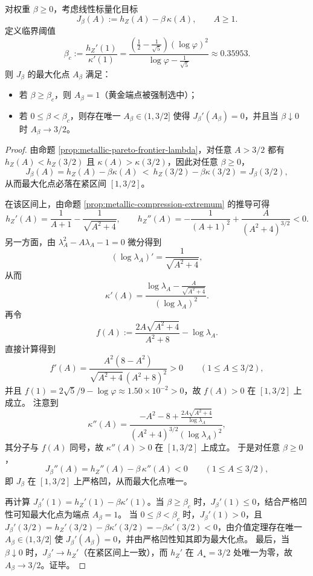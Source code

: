 \begin{proposition}[线性权衡的端点相变阈值]\label{prop:metallic-linear-scalarization-threshold}
对权重 \(\beta\ge 0\)，考虑线性标量化目标
\[
J_\beta(A):=h_Z(A)-\beta\,\kappa(A),\qquad A\ge 1.
\]
定义临界阈值
\[
\beta_c:=\frac{h_Z'(1)}{\kappa'(1)}
=\frac{\left(\frac{1}{2}-\frac{1}{\sqrt5}\right)(\log\varphi)^2}{\log\varphi-\frac{1}{\sqrt5}}
\approx 0.35953.
\]
则 \(J_\beta\) 的最大化点 \(A_\beta\) 满足：
\begin{itemize}
  \item 若 \(\beta\ge \beta_c\)，则 \(A_\beta=1\)（黄金端点被强制选中）；
  \item 若 \(0\le \beta<\beta_c\)，则存在唯一 \(A_\beta\in(1,3/2]\) 使得 \(J_\beta'(A_\beta)=0\)，并且当 \(\beta\downarrow 0\) 时 \(A_\beta\to 3/2\)。
\end{itemize}
\end{proposition}
\begin{proof}
由命题 \ref{prop:metallic-pareto-frontier-lambda}，对任意 \(A>3/2\) 都有 \(h_Z(A)<h_Z(3/2)\) 且 \(\kappa(A)>\kappa(3/2)\)，因此对任意 \(\beta\ge 0\)，
\[
J_\beta(A)=h_Z(A)-\beta\kappa(A)\ <\ h_Z(3/2)-\beta\kappa(3/2)=J_\beta(3/2),
\]
从而最大化点必落在紧区间 \([1,3/2]\)。
\par
在该区间上，由命题 \ref{prop:metallic-compression-extremum} 的推导可得
\[
h_Z'(A)=\frac{1}{A+1}-\frac{1}{\sqrt{A^2+4}},\qquad
h_Z''(A)=-\frac{1}{(A+1)^2}+\frac{A}{(A^2+4)^{3/2}}<0.
\]
另一方面，由 \(\lambda_A^2-A\lambda_A-1=0\) 微分得到
\[
(\log\lambda_A)'=\frac{1}{\sqrt{A^2+4}},
\]
从而
\[
\kappa'(A)=\frac{\log\lambda_A-\frac{A}{\sqrt{A^2+4}}}{(\log\lambda_A)^2}.
\]
再令
\[
f(A):=\frac{2A\sqrt{A^2+4}}{A^2+8}-\log\lambda_A.
\]
直接计算得到
\[
f'(A)=\frac{A^2(8-A^2)}{\sqrt{A^2+4}\,(A^2+8)^2}>0\qquad(1\le A\le 3/2),
\]
并且 \(f(1)=2\sqrt5/9-\log\varphi\approx 1.50\times 10^{-2}>0\)，故 \(f(A)>0\) 在 \([1,3/2]\) 上成立。
注意到
\[
\kappa''(A)=\frac{-A^2-8+\frac{2A\sqrt{A^2+4}}{\log\lambda_A}}{(A^2+4)^{3/2}(\log\lambda_A)^2},
\]
其分子与 \(f(A)\) 同号，故 \(\kappa''(A)>0\) 在 \([1,3/2]\) 上成立。
于是对任意 \(\beta\ge 0\)，
\[
J_\beta''(A)=h_Z''(A)-\beta\,\kappa''(A)<0\qquad(1\le A\le 3/2),
\]
即 \(J_\beta\) 在 \([1,3/2]\) 上严格凹，从而最大化点唯一。
\par
再计算 \(J_\beta'(1)=h_Z'(1)-\beta\kappa'(1)\)。当 \(\beta\ge\beta_c\) 时，\(J_\beta'(1)\le 0\)，结合严格凹性可知最大化点为端点 \(A_\beta=1\)。
当 \(0\le\beta<\beta_c\) 时，\(J_\beta'(1)>0\)，且 \(J_\beta'(3/2)=h_Z'(3/2)-\beta\kappa'(3/2)=-\beta\kappa'(3/2)<0\)，由介值定理存在唯一 \(A_\beta\in(1,3/2]\) 使 \(J_\beta'(A_\beta)=0\)，并由严格凹性知其即为最大化点。
最后，当 \(\beta\downarrow 0\) 时，\(J_\beta'\to h_Z'\)（在紧区间上一致），而 \(h_Z'\) 在 \(A_\star=3/2\) 处唯一为零，故 \(A_\beta\to 3/2\)。证毕。
\end{proof}

